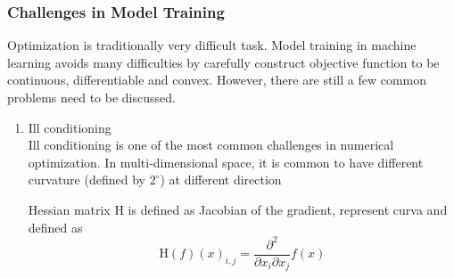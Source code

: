\subsubsection{Challenges in Model Training}

Optimization is traditionally very difficult task. Model training in machine learning avoids many difficulties by carefully construct objective function to be continuous, differentiable and convex. However, there are still a few common problems need to be discussed. 

\begin{enumerate}
    \item Ill conditioning\\
Ill conditioning is one of the most common challenges in numerical optimization. In multi-dimensional space, it is common to have different curvature (defined by $2^\circ$) at different direction

Hessian matrix $\mathrm{H}$ is defined as Jacobian of the gradient, represent curva and defined as 
\begin{equation}
    \mathrm{H}(f)(x)_{i,j} = \frac{\partial^2}{\partial x_i \partial x_j}f(x)
\end{equation}
\end{enumerate}

